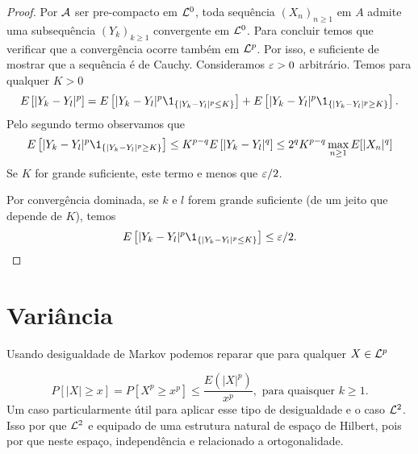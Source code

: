 \begin{topics}
 \begin{proof}
Por ${\mathcal A}$ ser pre-compacto em ${\mathcal L}^0$, toda sequência $(X_n)_{n\ge 1}$ em $A$ admite uma subsequência  $(Y_k)_{k\ge 1}$ convergente em ${\mathcal L}^0$.
Para concluir temos que verificar que a convergência ocorre também em ${\mathcal L}^p$. Por isso, e suficiente de mostrar que a sequência é de Cauchy.
Consideramos $\varepsilon>0$ arbitrário.
Temos para qualquer $K>0$
\begin{equation}
E\left[ |Y_k-Y_l |^p \right] = E\left[ |Y_k-Y_l|^p \1_{\{|Y_k-Y_l |^p \le K\}} \right] +  
E\left[ |Y_k-Y_l |^p \1_{\{|Y_k-Y_l |^p \ge K\}} \right].
\end{equation}
 Pelo segundo termo observamos que 
 \begin{equation}
 E\left[ |Y_k-Y_l|^p \1_{\{|Y_k-Y_l|^p \ge K\}} \right]\le K^{p-q} E\left[ |Y_k-Y_l|^q \right]\le 2^q K^{p-q} \max_{n\ge 1} E[|X_n|^q]
 \end{equation}
 Se $K$ for grande suficiente, este termo e menos que $\varepsilon/2$.
 
Por convergência dominada, se $k$ e $l$ forem grande suficiente (de um jeito que depende de $K$), temos 
\begin{equation}
 E\left[ |Y_k-Y_l|^p \1_{\{|Y_k-Y_l|^p \le K\}} \right]\le \gep/2.
 \end{equation}

 \end{proof}
 
 
\end{topics}







\section{Variância}

Usando desigualdade de Markov podemos reparar que para qualquer $X\in {\ensuremath{\mathcal L}}^p$

\begin{equation}
  P[|X| \geq x] = P [X^p \geq x^p] \leq \frac{E(|X|^p)}{x^p}, \text{ para quaisquer $k \geq 1$.}
\end{equation}
Um caso particularmente útil para aplicar esse tipo de desigualdade e o caso ${\mathcal L}^2$.
Isso por que  ${\mathcal L}^2$ e equipado de uma estrutura natural de espaço de Hilbert, pois por que neste espaço, 
independência e relacionado a ortogonalidade.

